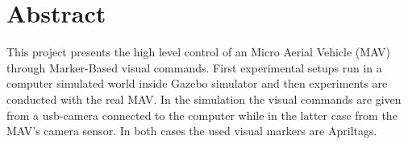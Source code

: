 \chapter*{Abstract}

This project presents the high level control of an Micro Aerial Vehicle (MAV) through Marker-Based visual commands. First experimental setups run in a computer simulated world inside Gazebo simulator\cite{GazeboSimulator} and then experiments are conducted with the real MAV. In the simulation the visual commands are given from a usb-camera connected to the computer while in the latter case from the MAV's camera sensor. In both cases the used visual markers are Apriltags\cite{richardson2013iros}. 